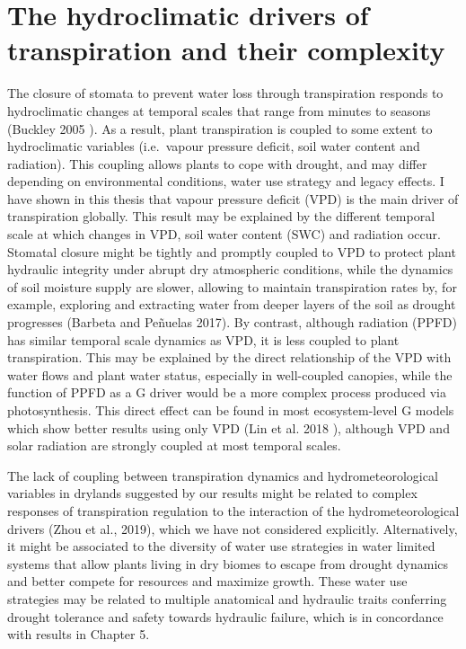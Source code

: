 \documentclass[11pt,twoside]{reedthesis}
\begin{document}
\section{The hydroclimatic drivers of transpiration and their
complexity}\label{the-hydroclimatic-drivers-of-transpiration-and-their-complexity}

The closure of stomata to prevent water loss through transpiration
responds to hydroclimatic changes at temporal scales that range from
minutes to seasons (Buckley 2005 ). As a result, plant transpiration is
coupled to some extent to hydroclimatic variables (i.e.~vapour pressure
deficit, soil water content and radiation). This coupling allows plants
to cope with drought, and may differ depending on environmental
conditions, water use strategy and legacy effects. I have shown in this
thesis that vapour pressure deficit (VPD) is the main driver of
transpiration globally. This result may be explained by the different
temporal scale at which changes in VPD, soil water content (SWC) and
radiation occur. Stomatal closure might be tightly and promptly coupled
to VPD to protect plant hydraulic integrity under abrupt dry atmospheric
conditions, while the dynamics of soil moisture supply are slower,
allowing to maintain transpiration rates by, for example, exploring and
extracting water from deeper layers of the soil as drought progresses
(Barbeta and Peñuelas 2017). By contrast, although radiation (PPFD) has
similar temporal scale dynamics as VPD, it is less coupled to plant
transpiration. This may be explained by the direct relationship of the
VPD with water flows and plant water status, especially in well-coupled
canopies, while the function of PPFD as a G driver would be a more
complex process produced via photosynthesis. This direct effect can be
found in most ecosystem-level G models which show better results using
only VPD (Lin et al. 2018 ), although VPD and solar radiation are
strongly coupled at most temporal scales.\par

The lack of coupling between transpiration dynamics and
hydrometeorological variables in drylands suggested by our results might
be related to complex responses of transpiration regulation to the
interaction of the hydrometeorological drivers (Zhou et al., 2019),
which we have not considered explicitly. Alternatively, it might be
associated to the diversity of water use strategies in water limited
systems that allow plants living in dry biomes to escape from drought
dynamics and better compete for resources and maximize growth. These
water use strategies may be related to multiple anatomical and hydraulic
traits conferring drought tolerance and safety towards hydraulic
failure, which is in concordance with results in Chapter 5.\par
\end{document}
